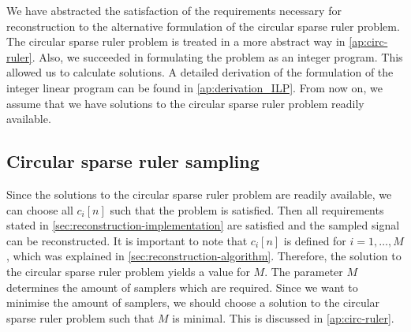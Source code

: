 \documentclass[a4paper, openany, oneside]{memoir}
\begin{document}
We have abstracted the satisfaction of the requirements necessary for reconstruction to the alternative formulation of the circular sparse ruler problem. The circular sparse ruler problem is treated in a more abstract way in \cref{ap:circ-ruler}. Also, we succeeded in formulating the problem as an integer program. This allowed us to calculate solutions. A detailed derivation of the formulation of the integer linear program can be found in \cref{ap:derivation_ILP}. From now on, we assume that we have solutions to the circular sparse ruler problem readily available.

\subsection{Circular sparse ruler sampling}\label{sub:ci-circ}
Since the solutions to the circular sparse ruler problem are readily available, we can choose all $c_i[n]$ such that the problem is satisfied. Then all requirements stated in \cref{sec:reconstruction-implementation} are satisfied and the sampled signal can be reconstructed. It is important to note that $c_i[n]$ is defined for $i = 1,\ldots,M$, which was explained in \cref{sec:reconstruction-algorithm}. Therefore, the solution to the circular sparse ruler problem yields a value for $M$. The parameter $M$ determines the amount of samplers which are required. Since we want to minimise the amount of samplers, we should choose a solution to the circular sparse ruler problem such that $M$ is minimal. This is discussed in \cref{ap:circ-ruler}.
\end{document}
